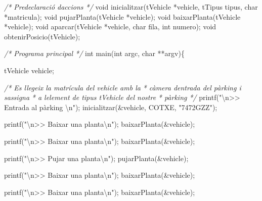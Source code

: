 \documentclass[]{book}
\newenvironment{Shaded}{\begin{snugshade}}{\end{snugshade}}
\newcommand{\CommentTok}[1]{\textcolor[rgb]{0.56,0.35,0.01}{\textit{#1}}}
\newcommand{\DataTypeTok}[1]{\textcolor[rgb]{0.13,0.29,0.53}{#1}}
\newcommand{\NormalTok}[1]{#1}
\newcommand{\SpecialCharTok}[1]{\textcolor[rgb]{0.00,0.00,0.00}{#1}}
\newcommand{\StringTok}[1]{\textcolor[rgb]{0.31,0.60,0.02}{#1}}
\begin{document}
\begin{Shaded}
\begin{Highlighting}[]
\CommentTok{/* Predeclaració d\textquotesingle{}accions */}
\DataTypeTok{void}\NormalTok{ inicialitzar(tVehicle *vehicle, tTipus tipus, }\DataTypeTok{char}\NormalTok{ *matricula);}
\DataTypeTok{void}\NormalTok{ pujarPlanta(tVehicle *vehicle);}
\DataTypeTok{void}\NormalTok{ baixarPlanta(tVehicle *vehicle);}
\DataTypeTok{void}\NormalTok{ aparcar(tVehicle *vehicle, }\DataTypeTok{char}\NormalTok{ fila, }\DataTypeTok{int}\NormalTok{ numero);}
\DataTypeTok{void}\NormalTok{ obtenirPosicio(tVehicle);}

\CommentTok{/* Programa principal */}
\DataTypeTok{int}\NormalTok{ main(}\DataTypeTok{int}\NormalTok{ argc, }\DataTypeTok{char}\NormalTok{ **argv)\{}
    
\NormalTok{    tVehicle vehicle;}
    
    \CommentTok{/* Es llegeix la matrícula del vehicle amb la }
\CommentTok{     * càmera d\textquotesingle{}entrada del pàrking i s\textquotesingle{}assigna}
\CommentTok{     * a l\textquotesingle{}element de tipus tVehicle del nostre}
\CommentTok{     * pàrking }
\CommentTok{     */}
\NormalTok{    printf(}\StringTok{"}\SpecialCharTok{\textbackslash{}n}\StringTok{\textgreater{}\textgreater{} Entrada al pàrking }\SpecialCharTok{\textbackslash{}n}\StringTok{"}\NormalTok{);}
\NormalTok{    inicialitzar(\&vehicle, COTXE, }\StringTok{"7472GZZ"}\NormalTok{);}
    
\NormalTok{    printf(}\StringTok{"}\SpecialCharTok{\textbackslash{}n}\StringTok{\textgreater{}\textgreater{} Baixar una planta}\SpecialCharTok{\textbackslash{}n}\StringTok{"}\NormalTok{);}
\NormalTok{    baixarPlanta(\&vehicle);}
    
\NormalTok{    printf(}\StringTok{"}\SpecialCharTok{\textbackslash{}n}\StringTok{\textgreater{}\textgreater{} Baixar una planta}\SpecialCharTok{\textbackslash{}n}\StringTok{"}\NormalTok{);}
\NormalTok{    baixarPlanta(\&vehicle);}
    
\NormalTok{    printf(}\StringTok{"}\SpecialCharTok{\textbackslash{}n}\StringTok{\textgreater{}\textgreater{} Pujar una planta}\SpecialCharTok{\textbackslash{}n}\StringTok{"}\NormalTok{);}
\NormalTok{    pujarPlanta(\&vehicle);}
    
\NormalTok{    printf(}\StringTok{"}\SpecialCharTok{\textbackslash{}n}\StringTok{\textgreater{}\textgreater{} Baixar una planta}\SpecialCharTok{\textbackslash{}n}\StringTok{"}\NormalTok{);}
\NormalTok{    baixarPlanta(\&vehicle);}
    
\NormalTok{    printf(}\StringTok{"}\SpecialCharTok{\textbackslash{}n}\StringTok{\textgreater{}\textgreater{} Baixar una planta}\SpecialCharTok{\textbackslash{}n}\StringTok{"}\NormalTok{);}
\NormalTok{    baixarPlanta(\&vehicle);}
    

\end{Highlighting}
\end{Shaded}
\end{document}
